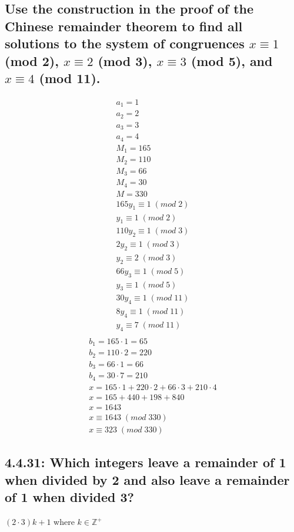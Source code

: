 \documentclass[12pt, a4paper]{report}
\begin{document}
				\subsection{Use the construction in the proof of the Chinese remainder theorem to find all solutions to the system of congruences $x\equiv 1$ (mod 2), $x\equiv 2$ (mod 3), $x\equiv 3$ (mod 5), and $x\equiv 4$ (mod 11).}
					\begin{align*}
						a_1=1\\
						a_2=2\\
						a_3=3\\
						a_4=4\\
						M_1=165\\
						M_2=110\\
						M_3=66\\
						M_4=30\\
						M=330\\[4mm]
						165y_1\equiv 1\;(mod\;2)\\
						y_1\equiv 1\;(mod\;2)\\
						110y_2\equiv 1\;(mod\;3)\\
						2y_2\equiv 1 \;(mod\;3)\\
						y_2\equiv 2\;(mod\;3)\\
						66y_3\equiv 1\;(mod\;5)\\
						y_3\equiv 1\;(mod\;5)\\
						30y_4\equiv 1\;(mod\;11)\\
						8y_4\equiv 1\;(mod\;11)\\
						y_4\equiv 7\;(mod\;11)\\[4mm]
					\end{align*}
					\begin{align*}
						b_1=165\cdot 1 = 65\\
						b_2=110\cdot 2 = 220\\
						b_3=66\cdot 1 = 66\\
						b_4=30\cdot 7 = 210\\[4mm]
						x=165\cdot 1 + 220\cdot 2 + 66\cdot 3 + 210\cdot 4\\
						x=165+440+198+840\\
						x=1643\\
						x\equiv 1643\;(mod\;330)\\
						x\equiv 323\;(mod\;330)
				\end{align*}
			\setcounter{subsection}{30}
			\subsection{4.4.31: Which integers leave a remainder of 1 when divided by 2 and also leave a remainder of 1 when divided 3?}
				$(2\cdot 3)k+1$ where $k\in\mathbb{Z}^+$
			\setcounter{subsection}{32}
\end{document}
